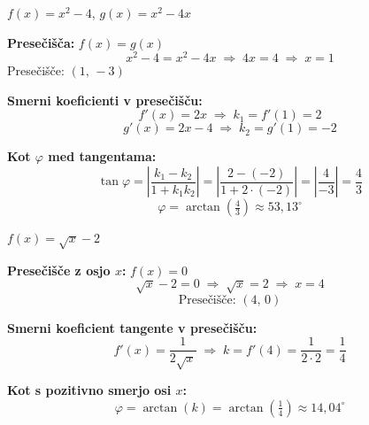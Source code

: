 \documentclass[a4paper,12pt]{letter}
\begin{document}
\newpage

\begin{resitev}

$f(x)=x^2-4$, \quad $g(x)=x^2-4x$

\textbf{Presečišča:} $f(x)=g(x)$
$$
x^2-4=x^2-4x \;\Rightarrow\; 4x=4 \;\Rightarrow\; x=1
$$
Presečišče: $(1,\,-3)$

\textbf{Smerni koeficienti v presečišču:}
$$
f'(x)=2x \;\Rightarrow\; k_1=f'(1)=2
$$
$$
g'(x)=2x-4 \;\Rightarrow\; k_2=g'(1)=-2
$$

\textbf{Kot $\varphi$ med tangentama:}
$$
\tan\varphi=\left|\frac{k_1-k_2}{1+k_1 k_2}\right|
=\left|\frac{2-(-2)}{1+2\cdot(-2)}\right|
=\left|\frac{4}{-3}\right|=\frac{4}{3}
$$
$$
\varphi=\arctan\!\left(\tfrac{4}{3}\right)\approx\boxed{53{,}13^\circ}
$$

\end{resitev}

\vspace{0.5cm}

\begin{resitev}

$f(x)=\sqrt{x}-2$

\textbf{Presečišče z osjo $x$:} $f(x)=0$
$$
\sqrt{x}-2=0 \;\Rightarrow\; \sqrt{x}=2 \;\Rightarrow\; x=4
$$
$$
\boxed{\text{Presečišče: }(4,\,0)}
$$

\textbf{Smerni koeficient tangente v presečišču:}
$$
f'(x)=\frac{1}{2\sqrt{x}} \;\Rightarrow\; k=f'(4)=\frac{1}{2\cdot2}=\frac{1}{4}
$$

\textbf{Kot s pozitivno smerjo osi $x$:}
$$
\varphi=\arctan(k)=\arctan\!\left(\tfrac{1}{4}\right)\approx\boxed{14{,}04^\circ}
$$

\end{resitev}
\end{document}
